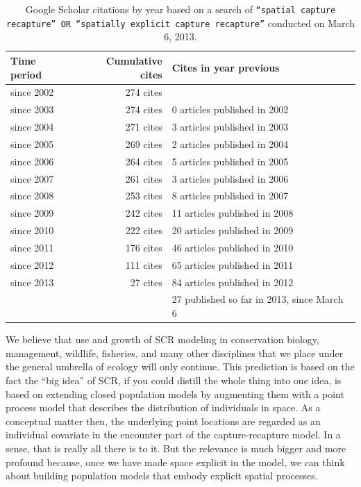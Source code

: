 \begin{table}[ht]
\caption{Google Scholar citations by year based on a search of
{\tt ``spatial capture recapture'' OR ``spatially explicit
capture recapture''} conducted on March 6, 2013.
}
\begin{tabular}{lrl} \hline \hline
Time period & Cumulative cites & Cites in year previous \\ \hline
since 2002 & 274 cites & \\
since 2003 & 274 cites &0 articles published in 2002 \\
since 2004 & 271 cites &3 articles published in 2003 \\
since 2005 & 269 cites &2 articles published in 2004 \\
since 2006 & 264 cites &5 articles published in 2005 \\
since 2007 & 261 cites &3 articles published in 2006 \\
since 2008 & 253 cites &8 articles published in 2007 \\
since 2009 & 242 cites &11 articles published in 2008 \\
since 2010 & 222 cites &20 articles published in 2009 \\
since 2011 & 176 cites &46 articles published in 2010 \\
since 2012 & 111 cites &65 articles published in 2011 \\
since 2013 & 27 cites &84 articles published in 2012 \\
& &27 published so far in 2013, since March 6
\\ \hline
\end{tabular}
\label{last.tab.cites}
\end{table}

We believe that use and growth of SCR modeling in conservation biology,
management, wildlife, fisheries, and many other disciplines that we place under
the general umbrella of ecology will only continue.
This prediction is based on the fact %
the ``big idea'' of SCR,
if you could distill the whole thing into one idea, is based on
extending closed population models by augmenting them with a point
process model that describes the distribution of individuals
\citep{efford:2004} in space. As a conceptual matter then, the
underlying point locations are regarded as an individual covariate in
the encounter part of the capture-recapture model. In a sense, that is
really all there is to it. But the relevance is much bigger and more
profound because, once we have made space explicit in the model,
we can think about building population models that embody explicit
spatial processes.

